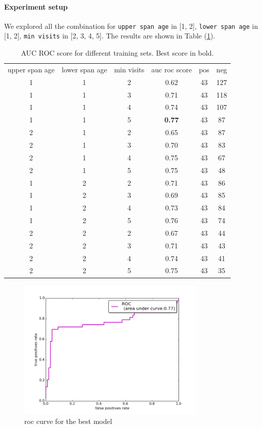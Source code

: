 \documentclass{article}
\begin{document}
\paragraph{Experiment setup}
We explored all the combination for \texttt{upper span age} in [1, 2], \texttt{lower span age} in [1, 2], \texttt{min visits} in [2, 3, 4, 5]. The results are shown in Table (\ref{table:exp_res}).


\begin{table}[!h]
	\centering
	\begin{tabular}{c  c  c | c  c c}
		upper span age & lower span age & min visits & auc roc score & pos & neg\\
		1 & 1 & 2  & 0.62 & 43 & 127\\
		1 & 1 & 3  & 0.71 & 43 & 118\\
		1 & 1 & 4  & 0.74 & 43 & 107\\
		1 & 1 & 5  & \textbf{0.77} & 43 & 87\\
		2 & 1 & 2  & 0.65 & 43 & 87\\
		2 & 1 & 3  & 0.70 & 43 & 83\\
		2 & 1 & 4  & 0.75 & 43 & 67\\
		2 & 1 & 5  & 0.75 & 43 & 48\\
		1 & 2 & 2  & 0.71 & 43 & 86\\
		1 & 2 & 3  & 0.69 & 43 & 85\\
		1 & 2 & 4  & 0.73 & 43 & 84\\
		1 & 2 & 5  & 0.76 & 43 & 74\\
		2 & 2 & 2  & 0.67 & 43 & 44\\
		2 & 2 & 3  & 0.71 & 43 & 43\\
		2 & 2 & 4  & 0.74 & 43 & 41\\
		2 & 2 & 5  & 0.75 & 43 & 35\\

	\end{tabular}
	\caption{AUC ROC score for different training sets. Best score in bold.}
	\label{table:exp_res}
\end{table}


\begin{figure}[h]
	\centering
	\includegraphics[width= 0.8\textwidth]{roc.png}
	\caption{roc curve for the best model}
	\label{fig:roc_best}
\end{figure}
\end{document}
